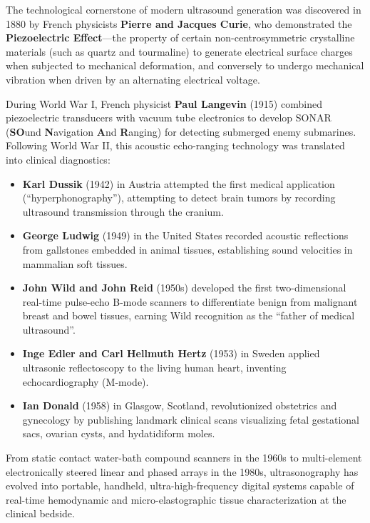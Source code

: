 \documentclass[11pt,a4paper]{article}
\begin{document}
The technological cornerstone of modern ultrasound generation was discovered in 1880 by French physicists \textbf{Pierre and Jacques Curie}, who demonstrated the \textbf{Piezoelectric Effect}—the property of certain non-centrosymmetric crystalline materials (such as quartz and tourmaline) to generate electrical surface charges when subjected to mechanical deformation, and conversely to undergo mechanical vibration when driven by an alternating electrical voltage.

During World War I, French physicist \textbf{Paul Langevin} (1915) combined piezoelectric transducers with vacuum tube electronics to develop SONAR (\textbf{SO}und \textbf{N}avigation \textbf{A}nd \textbf{R}anging) for detecting submerged enemy submarines. Following World War II, this acoustic echo-ranging technology was translated into clinical diagnostics:
\begin{itemize}[leftmargin=*]
    \item \textbf{Karl Dussik} (1942) in Austria attempted the first medical application (``hyperphonography''), attempting to detect brain tumors by recording ultrasound transmission through the cranium.
    \item \textbf{George Ludwig} (1949) in the United States recorded acoustic reflections from gallstones embedded in animal tissues, establishing sound velocities in mammalian soft tissues.
    \item \textbf{John Wild and John Reid} (1950s) developed the first two-dimensional real-time pulse-echo B-mode scanners to differentiate benign from malignant breast and bowel tissues, earning Wild recognition as the ``father of medical ultrasound''.
    \item \textbf{Inge Edler and Carl Hellmuth Hertz} (1953) in Sweden applied ultrasonic reflectoscopy to the living human heart, inventing echocardiography (M-mode).
    \item \textbf{Ian Donald} (1958) in Glasgow, Scotland, revolutionized obstetrics and gynecology by publishing landmark clinical scans visualizing fetal gestational sacs, ovarian cysts, and hydatidiform moles.
\end{itemize}

From static contact water-bath compound scanners in the 1960s to multi-element electronically steered linear and phased arrays in the 1980s, ultrasonography has evolved into portable, handheld, ultra-high-frequency digital systems capable of real-time hemodynamic and micro-elastographic tissue characterization at the clinical bedside.
\end{document}
